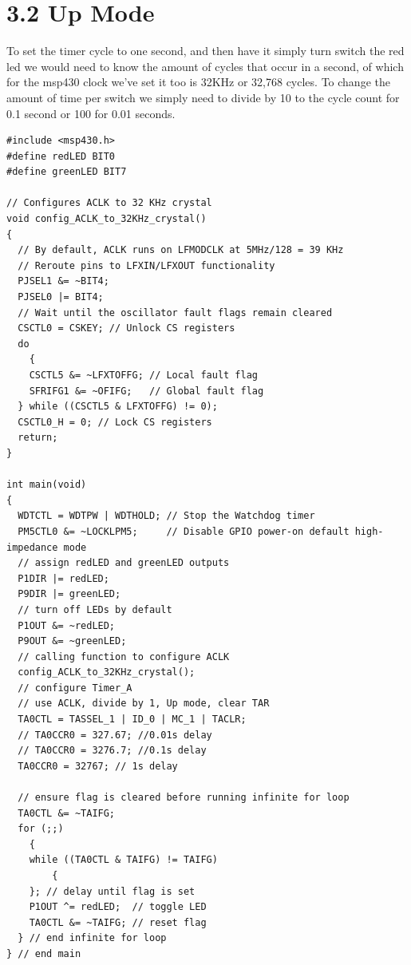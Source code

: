 \documentclass{article}
\begin{document}
\section{3.2 Up Mode}
To set the timer cycle to one second, and then have it simply turn switch the red led we would need to know the amount of cycles that occur in a second, of which for the msp430 clock we've set it too is 32KHz or 32,768 cycles. To change the amount of time per switch we simply need to divide by 10 to the cycle count for 0.1 second or 100 for 0.01 seconds.
\begin{lstlisting}
#include <msp430.h>
#define redLED BIT0
#define greenLED BIT7

// Configures ACLK to 32 KHz crystal
void config_ACLK_to_32KHz_crystal() 
{
  // By default, ACLK runs on LFMODCLK at 5MHz/128 = 39 KHz
  // Reroute pins to LFXIN/LFXOUT functionality
  PJSEL1 &= ~BIT4;
  PJSEL0 |= BIT4;
  // Wait until the oscillator fault flags remain cleared
  CSCTL0 = CSKEY; // Unlock CS registers
  do
	{
    CSCTL5 &= ~LFXTOFFG; // Local fault flag
    SFRIFG1 &= ~OFIFG;   // Global fault flag
  } while ((CSCTL5 & LFXTOFFG) != 0);
  CSCTL0_H = 0; // Lock CS registers
  return;
}

int main(void)
{
  WDTCTL = WDTPW | WDTHOLD; // Stop the Watchdog timer
  PM5CTL0 &= ~LOCKLPM5;     // Disable GPIO power-on default high-impedance mode
  // assign redLED and greenLED outputs
  P1DIR |= redLED;
  P9DIR |= greenLED;
  // turn off LEDs by default
  P1OUT &= ~redLED;
  P9OUT &= ~greenLED;
  // calling function to configure ACLK
  config_ACLK_to_32KHz_crystal();
  // configure Timer_A
  // use ACLK, divide by 1, Up mode, clear TAR
  TA0CTL = TASSEL_1 | ID_0 | MC_1 | TACLR;
  // TA0CCR0 = 327.67; //0.01s delay
  // TA0CCR0 = 3276.7; //0.1s delay
  TA0CCR0 = 32767; // 1s delay

  // ensure flag is cleared before running infinite for loop
  TA0CTL &= ~TAIFG;
  for (;;)
	{
    while ((TA0CTL & TAIFG) != TAIFG) 
		{
    }; // delay until flag is set
    P1OUT ^= redLED;  // toggle LED
    TA0CTL &= ~TAIFG; // reset flag
  } // end infinite for loop
} // end main
\end{lstlisting}
\end{document}
